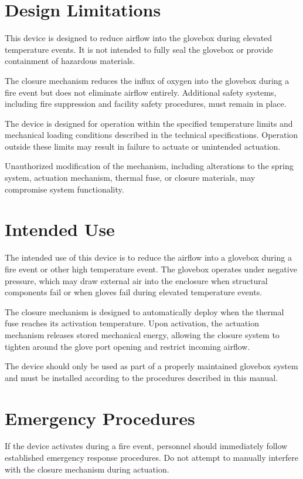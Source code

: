 \documentclass[12pt, a4paper]{report}
\begin{document}
\section{Design Limitations}
    This device is designed to reduce airflow into the glovebox during elevated temperature events. It is not intended to fully seal the glovebox or provide containment of hazardous materials.

    The closure mechanism reduces the influx of oxygen into the glovebox during a fire event but does not eliminate airflow entirely. Additional safety systems, including fire suppression and facility safety procedures, must remain in place.

    The device is designed for operation within the specified temperature limits and mechanical loading conditions described in the technical specifications. Operation outside these limits may result in failure to actuate or unintended actuation.

    Unauthorized modification of the mechanism, including alterations to the spring system, actuation mechanism, thermal fuse, or closure materials, may compromise system functionality. 
    
\section{Intended Use}
    The intended use of this device is to reduce the airflow into a glovebox during a fire event or other high temperature event. The glovebox operates under negative pressure, which may draw external air into the enclosure when structural components fail or when gloves fail during elevated temperature events.

    The closure mechanism is designed to automatically deploy when the thermal fuse reaches its activation temperature. Upon activation, the actuation mechanism releases stored mechanical energy, allowing the closure system to tighten around the glove port opening and restrict incoming airflow.

    The device should only be used as part of a properly maintained glovebox system and must be installed according to the procedures described in this manual.
    
\section{Emergency Procedures}
    
    If the device activates during a fire event, personnel should immediately follow established emergency response procedures. Do not attempt to manually interfere with the closure mechanism during actuation.
\end{document}
